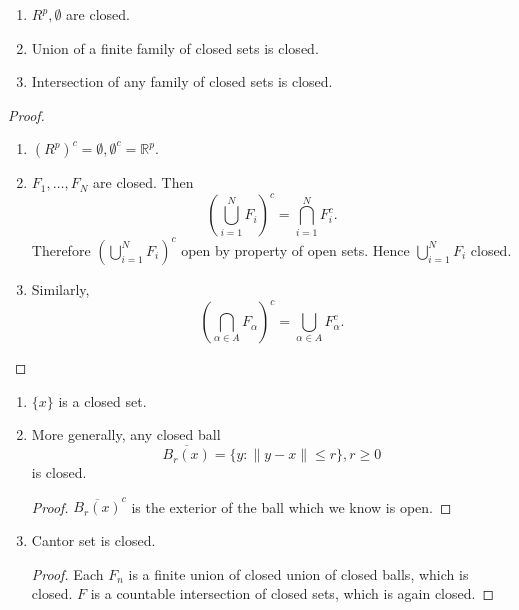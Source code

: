 \begin{proposition}
	\quad
	\begin{enumerate}
		\item $R^{p}, \emptyset $ are closed.
		\item Union of a finite family of closed sets is closed.
		\item Intersection of any family of closed sets is closed.
	\end{enumerate}
\end{proposition}
\begin{proof}
	\begin{enumerate}
		\item $(R^p)^c = \emptyset , \emptyset ^c = \mathbb{R}^p$.
		\item $F_1, \ldots, F_N$ are closed. Then \[
		\left( \bigcup_{i = 1} ^N F_i \right) ^c = \bigcap_{i = 1} ^N F_i^c
		.\] 
		Therefore  $ \left( \bigcup_{i = 1} ^N F_i  \right) ^c$ open by property of open sets. Hence $ \bigcup_{i = 1} ^N F_i  $ closed.
	\item Similarly,
		 \[
			 \left( \bigcap_{\alpha \in A} F_\alpha \right) ^c = \bigcup_{\alpha \in A} F_\alpha^c
		.\] 
	\end{enumerate}
\end{proof}

\begin{example}
	\begin{enumerate}
		\item $\{x\} $ is a closed set. 
		\item More generally, any closed ball \[
			\overline{B_r(x)}  = \{y: \|y-x\|\le r\} , r\ge 0
		\] is closed.
		\begin{proof}
			$\overline{B_r(x)}^c$ is the exterior of the ball which we know is open.
		\end{proof}
	\item Cantor set is closed. 
		\begin{proof}
		Each $F_n$ is a finite union of closed union of closed balls, which is closed. $F$ is a countable intersection of closed sets, which is again closed.
		\end{proof}
	\end{enumerate}
\end{example}

